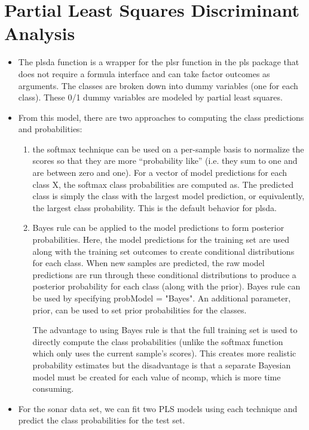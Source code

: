 \documentclass[caret-main.tex]{subfiles}
\begin{document}
\section{Partial Least Squares Discriminant Analysis}

\begin{itemize}
\item The plsda function is a wrapper for the plsr function in the pls package that does not require a formula interface and can take factor outcomes as arguments. The classes are broken down into dummy variables (one for each class). These 0/1 dummy variables are modeled by partial least squares.

\item From this model, there are two approaches to computing the class predictions and probabilities:
\begin{enumerate}
\item the softmax technique can be used on a per-sample basis to normalize the scores so that they are more ``probability like'' (i.e. they sum to one and are between zero and one). For a vector of model predictions for each class X, the softmax class probabilities are computed as. The predicted class is simply the class with the largest model prediction, or equivalently, the largest class probability. This is the default behavior for plsda.
\item Bayes rule can be applied to the model predictions to form posterior probabilities. Here, the model predictions for the training set are used along with the training set outcomes to create conditional distributions for each class. When new samples are predicted, the raw model predictions are run through these conditional distributions to produce a posterior probability for each class (along with the prior). Bayes rule can be used by specifying probModel = "Bayes". An additional parameter, prior, can be used to set prior probabilities for the classes.

The advantage to using Bayes rule is that the full training set is used to directly compute the class probabilities (unlike the softmax function which only uses the current sample's scores). 
This creates more realistic probability estimates but the disadvantage is that a separate Bayesian model must be created for each value of ncomp, which is more time consuming.
\end{enumerate}
\item For the sonar data set, we can fit two PLS models using each technique and predict the class probabilities 
for the test set.



\end{itemize}
\end{document}
